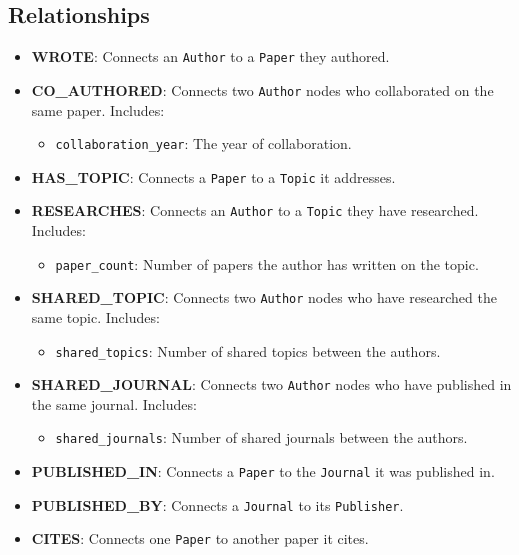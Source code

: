 \documentclass[conference, 12pt]{IEEEtran}
\begin{document}
\subsection{Relationships}
\begin{itemize}
    \item \textbf{WROTE}: Connects an \texttt{Author} to a \texttt{Paper} they authored.
    \item \textbf{CO\_AUTHORED}: Connects two \texttt{Author} nodes who collaborated on the same paper. Includes:
    \begin{itemize}
        \item \texttt{collaboration\_year}: The year of collaboration.
    \end{itemize}
    \item \textbf{HAS\_TOPIC}: Connects a \texttt{Paper} to a \texttt{Topic} it addresses.
    \item \textbf{RESEARCHES}: Connects an \texttt{Author} to a \texttt{Topic} they have researched. Includes:
    \begin{itemize}
        \item \texttt{paper\_count}: Number of papers the author has written on the topic.
    \end{itemize}
    \item \textbf{SHARED\_TOPIC}: Connects two \texttt{Author} nodes who have researched the same topic. Includes:
    \begin{itemize}
        \item \texttt{shared\_topics}: Number of shared topics between the authors.
    \end{itemize}
    \item \textbf{SHARED\_JOURNAL}: Connects two \texttt{Author} nodes who have published in the same journal. Includes:
    \begin{itemize}
        \item \texttt{shared\_journals}: Number of shared journals between the authors.
    \end{itemize}
    \item \textbf{PUBLISHED\_IN}: Connects a \texttt{Paper} to the \texttt{Journal} it was published in.
    \item \textbf{PUBLISHED\_BY}: Connects a \texttt{Journal} to its \texttt{Publisher}.
    \item \textbf{CITES}: Connects one \texttt{Paper} to another paper it cites.
\end{itemize}
\end{document}
